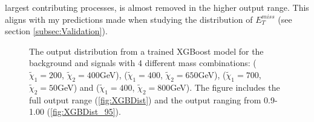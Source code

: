 largest contributing processes, is almost removed in the higher output range. This aligns with my predictions made when studying the 
distribution of $E_T^{miss}$ (see section \ref{subsec:Validation}). 
\begin{figure}
    \caption{The output distribution from a trained XGBoost model for the background and signals with 4 different mass combinations:
    ($\tilde{\chi}_1=200$, $\tilde{\chi}_2=400$GeV), ($\tilde{\chi}_1=400$, $\tilde{\chi}_2=650$GeV), 
    ($\tilde{\chi}_1=700$, $\tilde{\chi}_2=50$GeV) and ($\tilde{\chi}_1=400$, $\tilde{\chi}_2=800$GeV). 
    The figure includes the full output range (\ref{fig:XGBDist}) and the output ranging from 0.9-1.00 (\ref{fig:XGBDist_95}).}
    \label{fig:XGBDistComp}
\end{figure}
